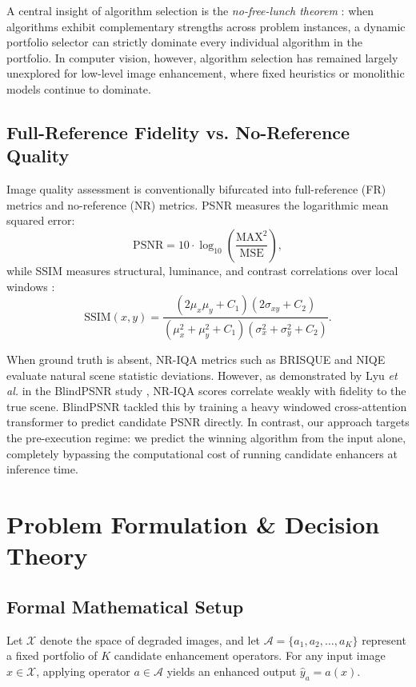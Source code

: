 \documentclass[journal]{IEEEtran}
\begin{document}
A central insight of algorithm selection is the \textit{no-free-lunch theorem} \cite{wolpert1997no}: when algorithms exhibit complementary strengths across problem instances, a dynamic portfolio selector can strictly dominate every individual algorithm in the portfolio. In computer vision, however, algorithm selection has remained largely unexplored for low-level image enhancement, where fixed heuristics or monolithic models continue to dominate.

\subsection{Full-Reference Fidelity vs. No-Reference Quality}
Image quality assessment is conventionally bifurcated into full-reference (FR) metrics and no-reference (NR) metrics. PSNR measures the logarithmic mean squared error:
\begin{equation}
\text{PSNR} = 10 \cdot \log_{10}\left(\frac{\text{MAX}^2}{\text{MSE}}\right),
\label{eq:psnr}
\end{equation}
while SSIM measures structural, luminance, and contrast correlations over local windows \cite{wang2004image, wang2009mean}:
\begin{equation}
\text{SSIM}(x, y) = \frac{(2\mu_x\mu_y + C_1)(2\sigma_{xy} + C_2)}{(\mu_x^2 + \mu_y^2 + C_1)(\sigma_x^2 + \sigma_y^2 + C_2)}.
\label{eq:ssim}
\end{equation}

When ground truth is absent, NR-IQA metrics such as BRISQUE \cite{mittal2012no} and NIQE \cite{mittal2013making} evaluate natural scene statistic deviations. However, as demonstrated by Lyu \textit{et al.} in the BlindPSNR study \cite{lyu2026blindpsnr}, NR-IQA scores correlate weakly with fidelity to the true scene. BlindPSNR tackled this by training a heavy windowed cross-attention transformer to predict candidate PSNR directly. In contrast, our approach targets the pre-execution regime: we predict the winning algorithm from the input alone, completely bypassing the computational cost of running candidate enhancers at inference time.

\section{Problem Formulation \& Decision Theory}

\subsection{Formal Mathematical Setup}
Let $\mathcal{X}$ denote the space of degraded images, and let $\mathcal{A} = \{a_1, a_2, \dots, a_K\}$ represent a fixed portfolio of $K$ candidate enhancement operators. For any input image $x \in \mathcal{X}$, applying operator $a \in \mathcal{A}$ yields an enhanced output $\hat{y}_a = a(x)$.
\end{document}
